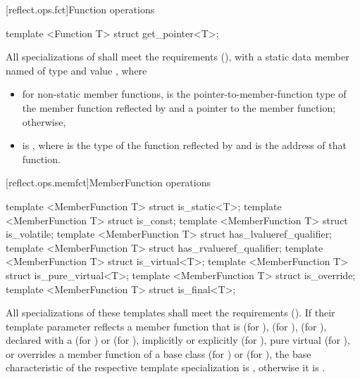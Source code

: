 [reflect.ops.fct]{Function operations}
\begin{std.txt}\color{addclr}
\begin{itemdecl}
template <Function T> struct get_pointer<T>;
\end{itemdecl}
\begin{itemdescr}
\pnum
      All specializations of  shall meet the  requirements (), with a static data member named  of type  and value , where
         \begin{itemize}
           \item for non-static member functions,  is the pointer-to-member-function type of the member function reflected by  and  a pointer to the member function; otherwise,
           \item {} is , where  is the type of the function reflected by  and  is the address of that function. 
         \end{itemize}
\end{itemdescr}
\end{std.txt}

[reflect.ops.memfct]{MemberFunction operations}
\begin{std.txt}\color{addclr}
\begin{itemdecl}
template <MemberFunction T> struct is_static<T>;
template <MemberFunction T> struct is_const;
template <MemberFunction T> struct is_volatile;
template <MemberFunction T> struct has_lvalueref_qualifier;
template <MemberFunction T> struct has_rvalueref_qualifier;
template <MemberFunction T> struct is_virtual<T>;
template <MemberFunction T> struct is_pure_virtual<T>;
template <MemberFunction T> struct is_override;
template <MemberFunction T> struct is_final<T>;
\end{itemdecl}
\begin{itemdescr}
\pnum
      All specializations of these templates shall meet the
       requirements (). If their template
      parameter reflects a member function that is  (for
      ),  (for ),
       (for ), declared with a
       \tcode{\&} (for
      ) or \tcode{\&\&} (for
      ), implicitly or explicitly 
      (for ), pure virtual (for ), or
      overrides a member function of a base class (for ) or 
      (for ), the base characteristic of the respective
      template specialization is , otherwise it is
      .
\end{itemdescr}
\end{std.txt}


